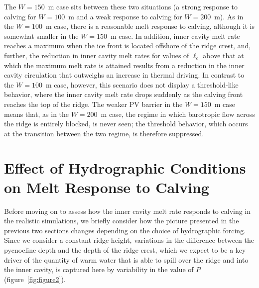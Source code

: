 \documentclass[draft]{agujournal2019}
\begin{document}
The $W = 150$~m case sits between these two situations (a strong response to calving for $W = 100$~m and a weak response to calving for $W = 200$~m). As in the $W = 100$~m case, there is a reasonable melt response to calving, although it is somewhat smaller in the $W = 150$~m case. In addition, inner cavity melt rate reaches a maximum when the ice front is located offshore of the ridge crest, and, further, the reduction in inner cavity melt rates for values of $\ell_c$ above that at which the maximum melt rate is attained results from a reduction in the inner cavity circulation that outweighs an increase in thermal driving. In contrast to the $W = 100$~m case, however, this scenario does not display a threshold-like behavior, where the inner cavity melt rate drops suddenly as the calving front reaches the top of the ridge. The weaker PV barrier in the $W=150$~m case means that, as in the $W = 200$~m case, the regime in which barotropic flow across the ridge is entirely blocked, is never seen; the threshold behavior, which occurs at the transition between the two regime, is therefore suppressed.


\section{Effect of Hydrographic Conditions on Melt Response to Calving}\label{S:Results:P}
Before moving on to assess how the inner cavity melt rate responds to calving in the realistic simulations, we briefly consider how the picture presented in the previous two sections changes depending on the choice of hydrographic forcing. Since we consider a constant ridge height, variations in the difference between the pycnocline depth and the depth of the ridge crest, which we expect to be a key driver of the quantity of warm water that is able to spill over the ridge and into the inner cavity, is captured here by variability in the value of $P$ (figure~\ref{fig:figure2}).
\end{document}
